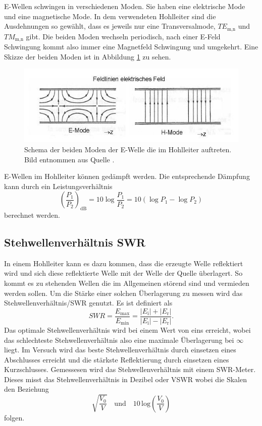 E-Wellen schwingen in verschiedenen Moden.
Sie haben eine elektrische Mode und eine magnetische Mode.
In dem verwendeten Hohlleiter sind die Ausdehnungen so gewählt, dass es jeweils nur eine Transversalmode, $TE_\text{m,n}$ und $TM_\text{m,n}$ gibt.
Die beiden Moden wechseln periodisch, nach einer E-Feld Schwingung kommt also immer eine Magnetfeld Schwingung und umgekehrt.
Eine Skizze der beiden Moden ist in Abbildung \ref{fig:Moden_Hohleiter} zu sehen.

\begin{figure}
    \centering
    \includegraphics[width=\textwidth]{content/data/Moden_Hohleiter.JPG}
    \caption{Schema der beiden Moden der E-Welle die im Hohlleiter auftreten. Bild entnommen aus Quelle \cite{wikipedia}.}
    \label{fig:Moden_Hohleiter}
\end{figure}

E-Wellen im Hohlleiter können gedämpft werden. Die entsprechende Dämpfung kann durch ein Leistungsverhältnis
\begin{equation}
    \left (\frac{P_1}{P_2} \right )_\text{dB} = 10 \log \frac{P_1}{P_2} = 10 \left ( \log P_1 - \log P_2 \right )
\end{equation}
berechnet werden.
\FloatBarrier

\subsection{Stehwellenverhältnis SWR}
\label{sec:swr}
In einem Hohlleiter kann es dazu kommen, dass die erzeugte Welle reflektiert wird und sich diese reflektierte Welle mit der Welle der Quelle überlagert.
So kommt es zu stehenden Wellen die im Allgemeinen störend sind und vermieden werden sollen.
Um die Stärke einer solchen Überlagerung zu messen wird das Stehwellenverhältnis/SWR genutzt.
Es ist definiert als 
\begin{equation}
    SWR = \frac{E _\text{max}}{E _\text{min}} = \frac{\left | E _\text{i} \right | + \left | E _\text{r} \right |}{\left | E _\text{i} \right | - \left | E _\text{r} \right |}.
\end{equation}
Das optimale Stehwellenverhältnis wird bei einem Wert von eins erreicht, wobei das schlechteste Stehwellenverhältnis also eine maximale Überlagerung bei $ \infty $ liegt.
Im Versuch wird das beste Stehwellenverhältnis durch einsetzen eines Abschlusses erreicht und die stärkste Reflektierung durch einsetzen eines Kurzschlusses.
Gemessesen wird das Stehwellenverhältnis mit einem SWR-Meter.
Dieses misst das Stehwellenverhältnis in Dezibel oder VSWR wobei die Skalen den Beziehung
\begin{equation*}
    \sqrt{\frac{V_0}{V}}  \quad \text{und}  \quad 10 \, \text{log} \left ( \frac{V_0}{V}\right )  
\end{equation*}
folgen.

